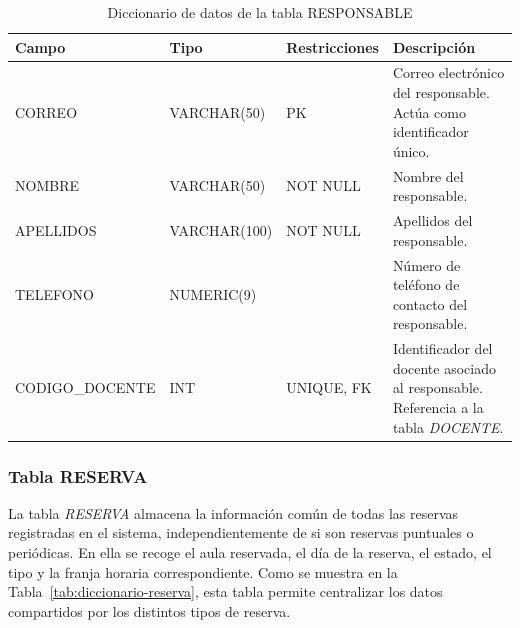 \begin{table}[H]
	\centering
	\scriptsize
	\setlength{\tabcolsep}{3pt}
	\renewcommand{\arraystretch}{1.15}
	\begin{tabularx}{\textwidth}{@{}
			>{\raggedright\arraybackslash}p{2.6cm}
			>{\raggedright\arraybackslash}p{2.2cm}
			>{\raggedright\arraybackslash}p{2.2cm}
			X@{}}
		\toprule
		\textbf{Campo} & \textbf{Tipo} & \textbf{Restricciones} & \textbf{Descripción} \\
		\midrule
		CORREO & VARCHAR(50) & PK & Correo electrónico del responsable. Actúa como identificador único. \\
		NOMBRE & VARCHAR(50) & NOT NULL & Nombre del responsable. \\
		APELLIDOS & VARCHAR(100) & NOT NULL & Apellidos del responsable. \\
		TELEFONO & NUMERIC(9) &  & Número de teléfono de contacto del responsable. \\
		CODIGO\_\newline DOCENTE & INT & UNIQUE, FK & Identificador del docente asociado al responsable. Referencia a la tabla \textit{DOCENTE}. \\
		\bottomrule
	\end{tabularx}
	\caption{Diccionario de datos de la tabla RESPONSABLE}
	\label{tab:diccionario-responsable}
\end{table}

\subsubsection{Tabla RESERVA}

 La tabla \textit{RESERVA} almacena la información común de todas las reservas registradas en el sistema, independientemente de si son reservas puntuales o periódicas. En ella se recoge el aula reservada, el día de la reserva, el estado, el tipo y la franja horaria correspondiente. Como se muestra en la Tabla~\ref{tab:diccionario-reserva}, esta tabla permite centralizar los datos compartidos por los distintos tipos de reserva.\\

